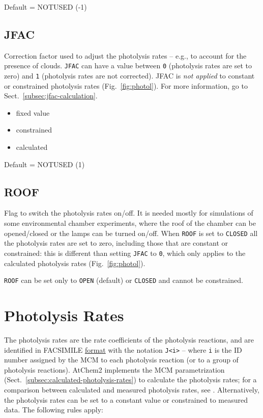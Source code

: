 Default = NOTUSED (-1)

\subsection{JFAC} \label{subsec:jfac}

Correction factor used to adjust the photolysis rates -- e.g., to
account for the presence of clouds. \texttt{JFAC} can have a value
between \texttt{0} (photolysis rates are set to zero) and \texttt{1}
(photolysis rates are not corrected). JFAC is \emph{not applied} to
constant or constrained photolysis rates (Fig.~\ref{fig:photol}). For
more information, go to Sect.~\ref{subsec:jfac-calculation}.

\begin{itemize}
\item fixed value
\item constrained
\item calculated
\end{itemize}

Default = NOTUSED (1)

\subsection{ROOF} \label{subsec:roof}

Flag to switch the photolysis rates on/off. It is needed mostly for
simulations of some environmental chamber experiments, where the roof
of the chamber can be opened/closed or the lamps can be turned on/off.
When \texttt{ROOF} is set to \texttt{CLOSED} all the photolysis rates
are set to zero, including those that are constant or constrained:
this is different than setting \texttt{JFAC} to \texttt{0}, which only
applies to the calculated photolysis rates (Fig.~\ref{fig:photol}).

\texttt{ROOF} can be set only to \texttt{OPEN} (default) or
\texttt{CLOSED} and cannot be constrained.

\section{Photolysis Rates} \label{sec:photolysis-rates}

The photolysis rates are the rate coefficients of the photolysis
reactions, and are identified in FACSIMILE
\hyperref[subsec:facsimile-format]{format} with the notation
\texttt{J<i>} -- where \texttt{i} is the ID number assigned by the MCM
to each photolysis reaction (or to a group of photolysis
reactions). AtChem2 implements the MCM parametrization
(Sect.~\ref{subsec:calculated-photolysis-rates}) to calculate the
photolysis rates; for a comparison between calculated and measured
photolysis rates, see \citet{sommariva_2020}. Alternatively, the
photolysis rates can be set to a constant value or constrained to
measured data. The following rules apply:

